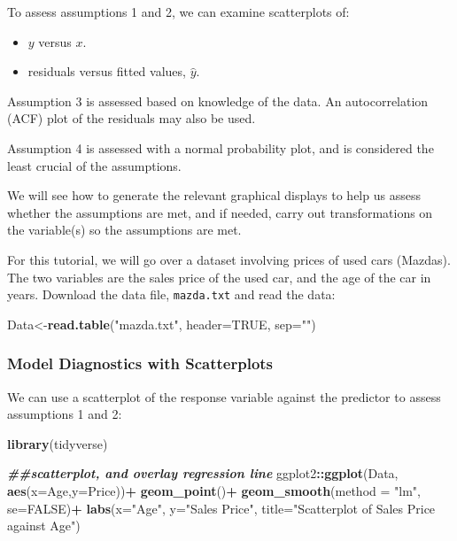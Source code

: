 \documentclass[
]{book}
\newenvironment{Shaded}{\begin{snugshade}}{\end{snugshade}}
\newcommand{\AttributeTok}[1]{\textcolor[rgb]{0.13,0.29,0.53}{#1}}
\newcommand{\ConstantTok}[1]{\textcolor[rgb]{0.56,0.35,0.01}{#1}}
\newcommand{\DocumentationTok}[1]{\textcolor[rgb]{0.56,0.35,0.01}{\textbf{\textit{#1}}}}
\newcommand{\FunctionTok}[1]{\textcolor[rgb]{0.13,0.29,0.53}{\textbf{#1}}}
\newcommand{\NormalTok}[1]{#1}
\newcommand{\OtherTok}[1]{\textcolor[rgb]{0.56,0.35,0.01}{#1}}
\newcommand{\SpecialCharTok}[1]{\textcolor[rgb]{0.81,0.36,0.00}{\textbf{#1}}}
\newcommand{\StringTok}[1]{\textcolor[rgb]{0.31,0.60,0.02}{#1}}
\providecommand{\tightlist}{%
  \setlength{\itemsep}{0pt}\setlength{\parskip}{0pt}}
\begin{document}
To assess assumptions 1 and 2, we can examine scatterplots of:

\begin{itemize}
\tightlist
\item
  \(y\) versus \(x\).
\item
  residuals versus fitted values, \(\hat{y}\).
\end{itemize}

Assumption 3 is assessed based on knowledge of the data. An autocorrelation (ACF) plot of the residuals may also be used.

Assumption 4 is assessed with a normal probability plot, and is considered the least crucial of the assumptions.

We will see how to generate the relevant graphical displays to help us assess whether the assumptions are met, and if needed, carry out transformations on the variable(s) so the assumptions are met.

For this tutorial, we will go over a dataset involving prices of used cars (Mazdas). The two variables are the sales price of the used car, and the age of the car in years. Download the data file, \texttt{mazda.txt} and read the data:

\begin{Shaded}
\begin{Highlighting}[]
\NormalTok{Data}\OtherTok{\textless{}{-}}\FunctionTok{read.table}\NormalTok{(}\StringTok{"mazda.txt"}\NormalTok{, }\AttributeTok{header=}\ConstantTok{TRUE}\NormalTok{, }\AttributeTok{sep=}\StringTok{""}\NormalTok{)}
\end{Highlighting}
\end{Shaded}

\hypertarget{model-diagnostics-with-scatterplots}{%
\subsubsection*{Model Diagnostics with Scatterplots}\label{model-diagnostics-with-scatterplots}}

We can use a scatterplot of the response variable against the predictor to assess assumptions 1 and 2:

\begin{Shaded}
\begin{Highlighting}[]
\FunctionTok{library}\NormalTok{(tidyverse)}

\DocumentationTok{\#\#scatterplot, and overlay regression line}
\NormalTok{ggplot2}\SpecialCharTok{::}\FunctionTok{ggplot}\NormalTok{(Data, }\FunctionTok{aes}\NormalTok{(}\AttributeTok{x=}\NormalTok{Age,}\AttributeTok{y=}\NormalTok{Price))}\SpecialCharTok{+}
  \FunctionTok{geom\_point}\NormalTok{()}\SpecialCharTok{+}
  \FunctionTok{geom\_smooth}\NormalTok{(}\AttributeTok{method =} \StringTok{"lm"}\NormalTok{, }\AttributeTok{se=}\ConstantTok{FALSE}\NormalTok{)}\SpecialCharTok{+}
  \FunctionTok{labs}\NormalTok{(}\AttributeTok{x=}\StringTok{"Age"}\NormalTok{, }\AttributeTok{y=}\StringTok{"Sales Price"}\NormalTok{, }\AttributeTok{title=}\StringTok{"Scatterplot of Sales Price against Age"}\NormalTok{)}
\end{Highlighting}
\end{Shaded}
\end{document}
